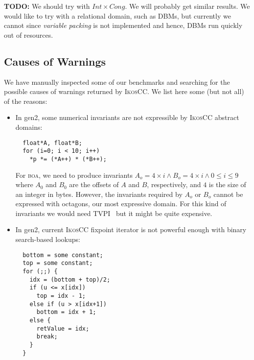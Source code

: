 \documentclass[a4]{article}
\newcommand{\ikoscc}{\textsc{IkosCC}\xspace}
\begin{document}
\textbf{TODO:} We should try with $Int \times Cong$. We will probably
get similar results. We would like to try with a relational domain,
such as DBMs, but currently we cannot since \emph{variable packing} is
not implemented and hence, DBMs run quickly out of resources.

\subsection{Causes of Warnings}
\label{sec:sec:warnings}

We have manually inspected some of our benchmarks and searching for
the possible causes of warnings returned by \ikoscc. We list here some
(but not all) of the reasons:

\begin{itemize}

\item In \textsf{gen2}, some numerical invariants are not expressible
  by \ikoscc abstract domains:

\begin{small}
\begin{verbatim}
  float*A, float*B; 
  for (i=0; i < 10; i++) 
    *p *= (*A++) * (*B++);
\end{verbatim}
\end{small}

\noindent For \textsc{boa}, we need to produce invariants $A_{o} = 4
\times i \wedge B_{o} = 4 \times i \wedge 0 \leq i \leq 9$ where
$A_{0}$ and $B_{0}$ are the offsets of $A$ and $B$, respectively, and
$4$ is the size of an integer in bytes. However, the invariants
required by $A_{o}$ or $B_{o}$ cannot be expressed with octagons, our
most expressive domain. For this kind of invariants we would need
TVPI~\cite{SimonK10} but it might be quite expensive. 

\item In \textsf{gen2}, current \ikoscc fixpoint iterator is not
  powerful enough with binary search-based lookups: 

\begin{small}
\begin{verbatim}
  bottom = some constant;
  top = some constant;
  for (;;) {
    idx = (bottom + top)/2;
    if (u <= x[idx])
      top = idx - 1;
    else if (u > x[idx+1]) 
      bottom = idx + 1;
    else {
      retValue = idx;
      break;
    }
  } 
\end{verbatim}
\end{small}


\end{itemize}
\end{document}
